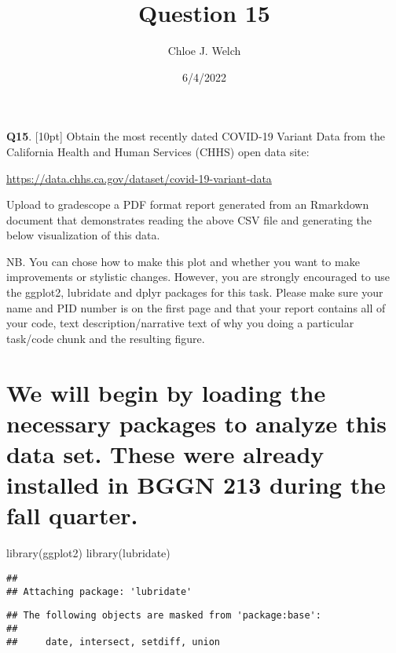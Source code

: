 \documentclass[
]{article}
\title{Question 15}
\author{Chloe J. Welch}
\date{6/4/2022}
\newenvironment{Shaded}{\begin{snugshade}}{\end{snugshade}}
\newcommand{\FunctionTok}[1]{\textcolor[rgb]{0.00,0.00,0.00}{#1}}
\newcommand{\NormalTok}[1]{#1}
\begin{document}
\maketitle

\textbf{Q15}. {[}10pt{]} Obtain the most recently dated COVID-19 Variant
Data from the California Health and Human Services (CHHS) open data
site:

\url{https://data.chhs.ca.gov/dataset/covid-19-variant-data}

Upload to gradescope a PDF format report generated from an Rmarkdown
document that demonstrates reading the above CSV file and generating the
below visualization of this data.

NB. You can chose how to make this plot and whether you want to make
improvements or stylistic changes. However, you are strongly encouraged
to use the ggplot2, lubridate and dplyr packages for this task. Please
make sure your name and PID number is on the first page and that your
report contains all of your code, text description/narrative text of why
you doing a particular task/code chunk and the resulting figure.

\hypertarget{we-will-begin-by-loading-the-necessary-packages-to-analyze-this-data-set.-these-were-already-installed-in-bggn-213-during-the-fall-quarter.}{%
\section{We will begin by loading the necessary packages to analyze this
data set. These were already installed in BGGN 213 during the fall
quarter.}\label{we-will-begin-by-loading-the-necessary-packages-to-analyze-this-data-set.-these-were-already-installed-in-bggn-213-during-the-fall-quarter.}}

\begin{Shaded}
\begin{Highlighting}[]
\FunctionTok{library}\NormalTok{(ggplot2)}
\FunctionTok{library}\NormalTok{(lubridate)}
\end{Highlighting}
\end{Shaded}

\begin{verbatim}
## 
## Attaching package: 'lubridate'
\end{verbatim}

\begin{verbatim}
## The following objects are masked from 'package:base':
## 
##     date, intersect, setdiff, union
\end{verbatim}
\end{document}
